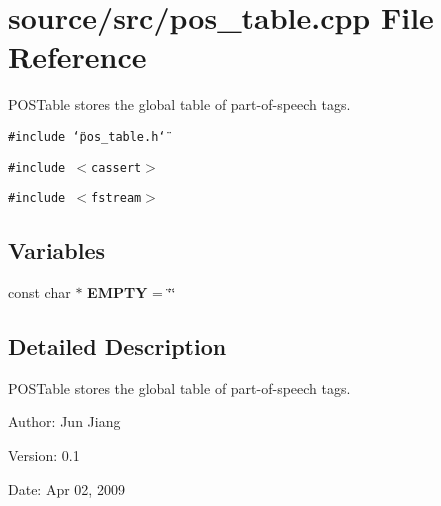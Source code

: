\section{source/src/pos\_\-table.cpp File Reference}
\label{pos__table_8cpp}
POSTable stores the global table of part-of-speech tags.  


{\tt \#include \char`\"{}pos\_\-table.h\char`\"{}}\par
{\tt \#include $<$cassert$>$}\par
{\tt \#include $<$fstream$>$}\par
\subsection*{Variables}
\begin{CompactItemize}
\item 
const char $\ast$ \textbf{EMPTY} = \char`\"{}\char`\"{}\label{pos__table_8cpp_d7f4cc3faf0602bfdba8969c757d21e0}

\end{CompactItemize}


\subsection{Detailed Description}
POSTable stores the global table of part-of-speech tags. 

\begin{Desc}
\item[Author:]Jun Jiang \end{Desc}
\begin{Desc}
\item[Version:]0.1 \end{Desc}
\begin{Desc}
\item[Date:]Apr 02, 2009 \end{Desc}

